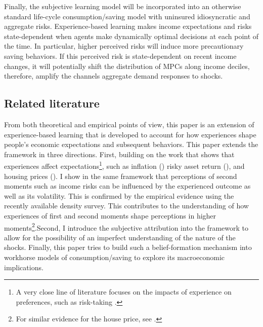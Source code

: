 \documentclass[12pt,notitlepage,onecolumn,aps,pra]{article}
\begin{document}
Finally, the subjective learning model will be incorporated into an
otherwise standard life-cycle consumption/saving model with uninsured
idiosyncratic and aggregate risks. Experience-based learning makes
income expectations and risks state-dependent when agents make
dynamically optimal decisions at each point of the time. In particular,
higher perceived risks will induce more precautionary saving behaviors.
If this perceived risk is state-dependent on recent income changes, it
will potentially shift the distribution of MPCs along income deciles,
therefore, amplify the channels aggregate demand responses to shocks.

\hypertarget{related-literature}{%
\subsection{Related literature}\label{related-literature}}

From both theoretical and empirical points of view, this paper is an
extension of experience-based learning that is developed to account for
how experiences shape people's economic expectations and subsequent
behaviors. This paper extends the framework in three directions. First,
building on the work that shows that experiences affect
expectations\footnote{A very close line of literature focuses on the impacts of experience on preferences, such as risk-taking \cite{malmendier2011depression}.},
such as inflation (\cite{malmendier2015learning}) risky asset return
(\cite{malmendier2019investor}), and housing prices
(\cite{kuchler2019personal}). I show in the same framework that
perceptions of second moments such as income risks can be influenced by
the experienced outcome as well as its volatility. This is confirmed by
the empirical evidence using the recently available density survey. This
contributes to the understanding of how experiences of first and second
moments shape perceptions in higher
moments\footnote{For similar evidence for the house price, see \cite{kuchler2019personal}.}.Second,
I introduce the subjective attribution into the framework to allow for
the possibility of an imperfect understanding of the nature of the
shocks. Finally, this paper tries to build such a belief-formation
mechanism into workhorse models of consumption/saving to explore its
macroeconomic implications.
\end{document}
